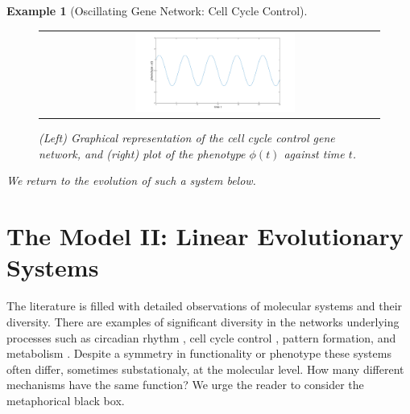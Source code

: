 \documentclass{article}
\newcommand{\plr}[1]{{\color{blue}\it #1}}
\newcommand{\1}{\mathbbm{1}}
\newtheorem{example}{Example}
\begin{document}
\begin{example}[Oscillating Gene Network: Cell Cycle Control]
\begin{figure}[H]
\begin{tabular}{cc}
\begin{tikzpicture}
            \end{tikzpicture} &
      \includegraphics[width=0.5\textwidth, height=0.25\paperheight]{osc_impulse}
   \end{tabular}
      \caption{(Left) Graphical representation of the cell cycle control gene network, and (right) plot of the phenotype $\phi(t)$ against time $t$.}
    \end{figure}
      We return to the evolution of such a system below.
  \end{example}

  \section*{The Model II: Linear Evolutionary Systems}

  The literature is filled with detailed observations of molecular systems and their diversity. There are examples of significant diversity in the networks underlying processes such as circadian rhythm \citep{sancar2008intelligent}, cell cycle control \citep{cross2011evolution, kearsey2003enigmatic}, pattern formation, and metabolism  \citep{lavoie2009rearrangements, martchenko2007transcriptional, dalal2016transcriptional, christensen2011unique, hartl2007induction, alam2013aspergillus}. Despite a symmetry in functionality or phenotype these systems often differ, sometimes substationaly, at the molecular level. How many different mechanisms have the same function? We urge the reader to consider the metaphorical black box.
\end{document}
